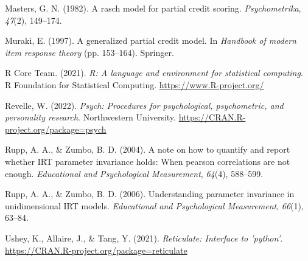 \documentclass[
  man]{apa6}
\newlength{\cslhangindent}
\newlength{\cslentryspacingunit} %
\newenvironment{CSLReferences}[2] %
 {%
  \setlength{\parindent}{0pt}
  \ifodd #1
  \let\oldpar\par
  \def\par{\hangindent=\cslhangindent\oldpar}
  \fi
  \setlength{\parskip}{#2\cslentryspacingunit}
 }%
 {}
\begin{document}
\begin{CSLReferences}{1}{0}
\leavevmode{}%
Masters, G. N. (1982). A rasch model for partial credit scoring. \emph{Psychometrika}, \emph{47}(2), 149--174.

\leavevmode{}%
Muraki, E. (1997). A generalized partial credit model. In \emph{Handbook of modern item response theory} (pp. 153--164). Springer.

\leavevmode{}%
R Core Team. (2021). \emph{R: A language and environment for statistical computing}. R Foundation for Statistical Computing. \url{https://www.R-project.org/}

\leavevmode{}%
Revelle, W. (2022). \emph{Psych: Procedures for psychological, psychometric, and personality research}. Northwestern University. \url{https://CRAN.R-project.org/package=psych}

\leavevmode{}%
Rupp, A. A., \& Zumbo, B. D. (2004). A note on how to quantify and report whether IRT parameter invariance holds: When pearson correlations are not enough. \emph{Educational and Psychological Measurement}, \emph{64}(4), 588--599.

\leavevmode{}%
Rupp, A. A., \& Zumbo, B. D. (2006). Understanding parameter invariance in unidimensional IRT models. \emph{Educational and Psychological Measurement}, \emph{66}(1), 63--84.

\leavevmode{}%
Ushey, K., Allaire, J., \& Tang, Y. (2021). \emph{Reticulate: Interface to 'python'}. \url{https://CRAN.R-project.org/package=reticulate}

\end{CSLReferences}

\endgroup
\end{document}
